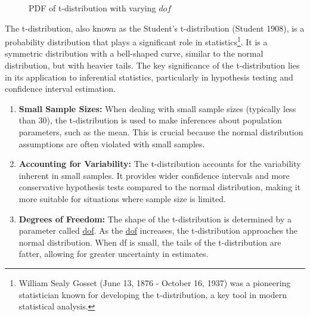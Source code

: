 \documentclass[
  a4paper,
]{scrbook}
\begin{document}
\begin{figure}[ht]


\caption{\label{fig-t-dist}PDF of t-distribution with varying \(dof\)}

\end{figure}%

The t-distribution, also known as the Student's t-distribution (Student
1908), is a probability distribution that plays a significant role in
statistics\footnote{William Sealy Gosset (June 13, 1876 - October 16,
  1937) was a pioneering statistician known for developing the
  t-distribution, a key tool in modern statistical analysis.}. It is a
symmetric distribution with a bell-shaped curve, similar to the normal
distribution, but with heavier tails. The key significance of the
t-distribution lies in its application to inferential statistics,
particularly in hypothesis testing and confidence interval estimation.

\begin{enumerate}
\def\labelenumi{\arabic{enumi}.}
\item
  \textbf{Small Sample Sizes:} When dealing with small sample sizes
  (typically less than 30), the t-distribution is used to make
  inferences about population parameters, such as the mean. This is
  crucial because the normal distribution assumptions are often violated
  with small samples.
\item
  \textbf{Accounting for Variability:} The t-distribution accounts for
  the variability inherent in small samples. It provides wider
  confidence intervals and more conservative hypothesis tests compared
  to the normal distribution, making it more suitable for situations
  where sample size is limited.
\item
  \textbf{Degrees of Freedom:} The shape of the t-distribution is
  determined by a parameter called \hyperref[acronyms_dof]{dof}. As the
  \hyperref[acronyms_dof]{dof} increases, the t-distribution approaches
  the normal distribution. When df is small, the tails of the
  t-distribution are fatter, allowing for greater uncertainty in
  estimates.
\end{enumerate}
\end{document}
